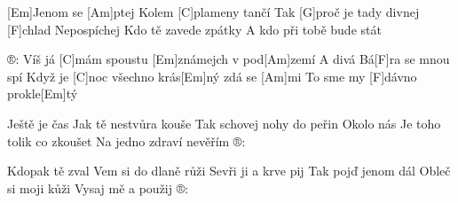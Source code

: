 
[Em]Jenom se [Am]ptej 
Kolem [C]plameny tančí 
Tak [G]proč je tady divnej [F]chlad 
Nepospíchej 
Kdo tě zavede zpátky 
A kdo při tobě bude stát 

®: Víš já [C]mám spoustu [Em]známejch v pod[Am]zemí 
A divá Bá[F]ra se mnou spí 
Když je [C]noc všechno krás[Em]ný zdá se [Am]mi 
To sme my [F]dávno prokle[Em]tý 
\begin{multicols}{2}
	Ještě je čas 
	Jak tě nestvůra kouše 
	Tak schovej nohy do peřin 
	Okolo nás 
	Je toho tolik co zkoušet 
	Na jedno zdraví nevěřím 
	®: 
	
	Kdopak tě zval 
	Vem si do dlaně růži 
	Sevři ji a krve pij 
	Tak pojď jenom dál 
	Obleč si moji kůži 
	Vysaj mě a použij 
	®: 
\end{multicols}